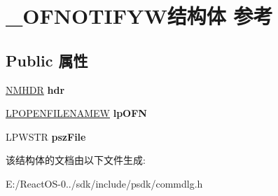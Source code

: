 \hypertarget{struct___o_f_n_o_t_i_f_y_w}{}\section{\+\_\+\+O\+F\+N\+O\+T\+I\+F\+Y\+W结构体 参考}
\label{struct___o_f_n_o_t_i_f_y_w}
\subsection*{Public 属性}
\begin{DoxyCompactItemize}
\item 
\mbox{\label{struct___o_f_n_o_t_i_f_y_w_a5308c5d7afc57b8f675a8e757f762d84}} 
\hyperlink{structtag_n_m_h_d_r}{N\+M\+H\+DR} {\bfseries hdr}
\item 
\mbox{\label{struct___o_f_n_o_t_i_f_y_w_ac1b05ec7543948cac6d41910efa6f39e}} 
\hyperlink{structtag_o_f_n_w}{L\+P\+O\+P\+E\+N\+F\+I\+L\+E\+N\+A\+M\+EW} {\bfseries lp\+O\+FN}
\item 
\mbox{\label{struct___o_f_n_o_t_i_f_y_w_a90aae57bf88e0d469fa6a69cea2b01a8}} 
L\+P\+W\+S\+TR {\bfseries psz\+File}
\end{DoxyCompactItemize}


该结构体的文档由以下文件生成\+:\begin{DoxyCompactItemize}
\item 
E\+:/\+React\+O\+S-\/0../sdk/include/psdk/commdlg.\+h\end{DoxyCompactItemize}
